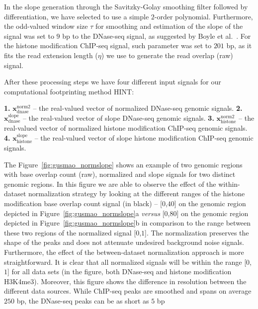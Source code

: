 In the slope generation through the Savitzky-Golay smoothing filter followed by differentiation, we have selected to use a simple $2$-order polynomial. Furthermore, the odd-valued window size $\tau$ for smoothing and estimation of the slope of the signal was set to $9$ bp to the DNase-seq signal, as suggested by Boyle et al.~\cite{boyle2011}. For the histone modification ChIP-seq signal, such parameter was set to $201$ bp, as it fits the read extension length ($\eta$) we use to generate the read overlap (raw) signal.

After these processing steps we have four different input signals for our computational footprinting method HINT:

\vspace{0.3cm}
\noindent
\textbf{1.} $\mathbf{x}^{\text{norm2}}_{\text{dnase}}$ -- the real-valued vector of normalized DNase-seq genomic signals.
\textbf{2.} $\mathbf{x}^{\text{slope}}_{\text{dnase}}$ -- the real-valued vector of slope DNase-seq genomic signals. 
\textbf{3.} $\mathbf{x}^{\text{norm2}}_{\text{histone}}$ -- the real-valued vector of normalized histone modification ChIP-seq genomic signals. 
\textbf{4.} $\mathbf{x}^{\text{slope}}_{\text{histone}}$ -- the real-valued vector of slope histone modification ChIP-seq genomic signals. 
\vspace{0.3cm}

The Figure~\ref{fig:gusmao_normslope} shows an example of two genomic regions with base overlap count (raw), normalized and slope signals for two distinct genomic regions. In this figure we are able to observe the effect of the within-dataset normalization strategy by looking at the different ranges of the histone modification base overlap count signal (in black) -- [$0$,$40$] on the genomic region depicted in Figure~\ref{fig:gusmao_normslope}a \emph{versus} [$0$,$80$] on the genomic region depicted in Figure~\ref{fig:gusmao_normslope}b in comparison to the range between these two regions of the normalized signal [$0$,$1$]. The normalization preserves the shape of the peaks and does not attenuate undesired background noise signals. Furthermore, the effect of the between-dataset normalization approach is more straightforward. It is clear that all normalized signals will be within the range [$0$,$1$] for all data sets (in the figure, both DNase-seq and histone modification H3K4me3). Moreover, this figure shows the difference in resolution between the different data sources. While ChIP-seq peaks are smoothed and spans on average $250$ bp, the DNase-seq peaks can be as short as $5$ bp


